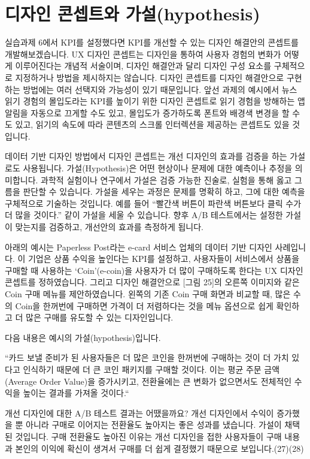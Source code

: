 \documentclass[
  letterpaper,
]{book}
\begin{document}
\section{디자인 콘셉트와
가설(hypothesis)}\label{uxb514uxc790uxc778-uxcf58uxc149uxd2b8uxc640-uxac00uxc124hypothesis}

실습과제 6에서 KPI를 설정했다면 KPI를 개선할 수 있는 디자인 해결안의
콘셉트를 개발해보겠습니다. UX 디자인 콘셉트는 디자인을 통하여 사용자
경험의 변화가 어떻게 이루어진다는 개념적 서술이며, 디자인 해결안과 달리
디자인 구성 요소를 구체적으로 지정하거나 방법을 제시하지는 않습니다.
디자인 콘셉트를 디자인 해결안으로 구현하는 방법에는 여러 선택지와
가능성이 있기 때문입니다. 앞선 과제의 예시에서 뉴스 읽기 경험의
몰입도라는 KPI를 높이기 위한 디자인 콘셉트로 읽기 경험을 방해하는 앱
알림을 자동으로 끄게할 수도 있고, 몰입도가 증가하도록 폰트와 배경색
변경을 할 수 도 있고, 읽기의 속도에 따라 콘텐츠의 스크롤 인터렉션을
제공하는 콘셉트도 있을 것입니다.

데이터 기반 디자인 방법에서 디자인 콘셉트는 개선 디자인의 효과를 검증을
하는 가설로도 사용됩니다. 가설(Hypothesis)은 어떤 현상이나 문제에 대한
예측이나 추정을 의미합니다. 과학적 실험이나 연구에서 가설은 검증 가능한
진술로, 실험을 통해 옳고 그름을 판단할 수 있습니다. 가설을 세우는 과정은
문제를 명확히 하고, 그에 대한 예측을 구체적으로 기술하는 것입니다. 예를
들어 ``빨간색 버튼이 파란색 버튼보다 클릭 수가 더 많을 것이다.'' 같이
가설을 세울 수 있습니다. 향후 A/B 테스트에서는 설정한 가설이 맞는지를
검증하고, 개선안의 효과를 측정하게 됩니다.

아래의 예시는 Paperless Post라는 e-card 서비스 업체의 데이터 기반 디자인
사례입니다. 이 기업은 상품 수익을 높인다는 KPI를 설정하고, 사용자들이
서비스에서 상품을 구매할 때 사용하는 `Coin'(e-coin)을 사용자가 더 많이
구매하도록 한다는 UX 디자인 콘셉트를 정하였습니다. 그리고 디자인
해결안으로 {[}그림 25{]}의 오른쪽 이미지와 같은 Coin 구매 메뉴를
제안하였습니다. 왼쪽의 기존 Coin 구매 화면과 비교할 때, 많은 수의 Coin을
한꺼번에 구매하면 가격이 더 저렴하다는 것을 메뉴 옵션으로 쉽게 확인하고
더 많은 구매를 유도할 수 있는 디자인입니다.

다음 내용은 예시의 가설(hypothesis)입니다.

``카드 보낼 준비가 된 사용자들은 더 많은 코인을 한꺼번에 구매하는 것이
더 가치 있다고 인식하기 때문에 더 큰 코인 패키지를 구매할 것이다. 이는
평균 주문 금액(Average Order Value)을 증가시키고, 전환율에는 큰 변화가
없으면서도 전체적인 수익을 높이는 결과를 가져올 것이다.``

개선 디자인에 대한 A/B 테스트 결과는 어땠을까요? 개선 디자인에서 수익이
증가했을 뿐 아니라 구매로 이어지는 전환율도 높아지는 좋은 성과를
냈습니다. 가설이 채택된 것입니다. 구매 전환율도 높아진 이유는 개선
디자인을 접한 사용자들이 구매 내용과 본인의 이익에 확신이 생겨서 구매를
더 쉽게 결정했기 때문으로 보입니다.(27)(28)
\end{document}
